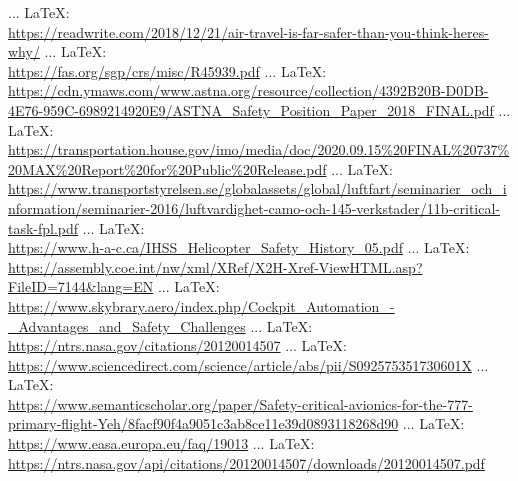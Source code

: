 \begin{thebibliography}{99}
{{{{{{{						 ... \LaTeX:\\ \url{https://readwrite.com/2018/12/21/air-travel-is-far-safer-than-you-think-heres-why/}
						 ... \LaTeX:\\ \url{https://fas.org/sgp/crs/misc/R45939.pdf}
						 ... \LaTeX:\\ \url{https://cdn.ymaws.com/www.astna.org/resource/collection/4392B20B-D0DB-4E76-959C-6989214920E9/ASTNA_Safety_Position_Paper_2018_FINAL.pdf}
						 ... \LaTeX:\\ \url{https://transportation.house.gov/imo/media/doc/2020.09.15%20FINAL%20737%20MAX%20Report%20for%20Public%20Release.pdf}
						 ... \LaTeX:\\ \url{https://www.transportstyrelsen.se/globalassets/global/luftfart/seminarier_och_information/seminarier-2016/luftvardighet-camo-och-145-verkstader/11b-critical-task-fpl.pdf}
						 ... \LaTeX:\\ \url{https://www.h-a-c.ca/IHSS_Helicopter_Safety_History_05.pdf}
						 ... \LaTeX:\\ \url{https://assembly.coe.int/nw/xml/XRef/X2H-Xref-ViewHTML.asp?FileID=7144&lang=EN}
						 ... \LaTeX:\\ \url{https://www.skybrary.aero/index.php/Cockpit_Automation_-_Advantages_and_Safety_Challenges}
						 ... \LaTeX:\\ \url{https://ntrs.nasa.gov/citations/20120014507}
						 ... \LaTeX:\\ \url{https://www.sciencedirect.com/science/article/abs/pii/S092575351730601X}
						 ... \LaTeX:\\ \url{https://www.semanticscholar.org/paper/Safety-critical-avionics-for-the-777-primary-flight-Yeh/8facf90f4a9051c3ab8ce11e39d0893118268d90}
						 ... \LaTeX:\\ \url{https://www.easa.europa.eu/faq/19013}
						 ... \LaTeX:\\ \url{https://ntrs.nasa.gov/api/citations/20120014507/downloads/20120014507.pdf}
						}}}}}}}
\end{thebibliography}
